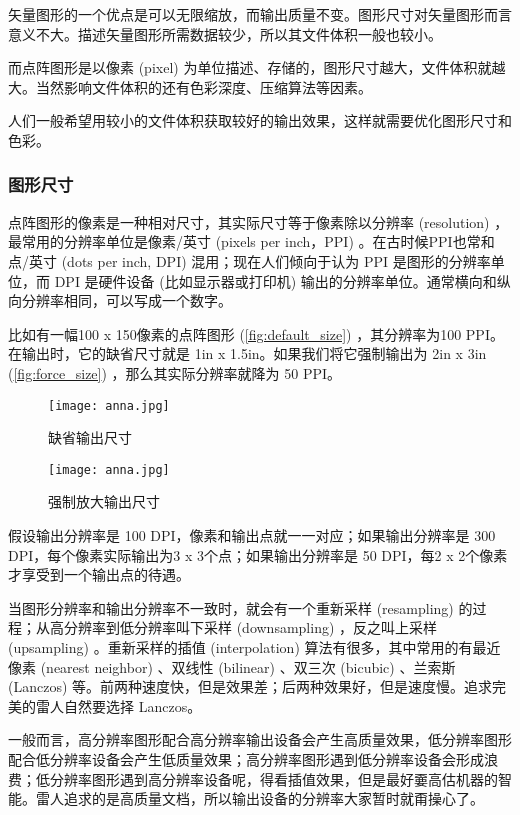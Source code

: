 矢量图形的一个优点是可以无限缩放，而输出质量不变。图形尺寸对矢量图形而言意义不大。描述矢量图形所需数据较少，所以其文件体积一般也较小。

而点阵图形是以像素 (pixel) 为单位描述、存储的，图形尺寸越大，文件体积就越大。当然影响文件体积的还有色彩深度、压缩算法等因素。

人们一般希望用较小的文件体积获取较好的输出效果，这样就需要优化图形尺寸和色彩。

\subsubsection{图形尺寸}

点阵图形的像素是一种相对尺寸，其实际尺寸等于像素除以分辨率 (resolution) ，最常用的分辨率单位是像素/英寸 (pixels per inch，PPI) 。在古时候PPI也常和点/英寸 (dots per inch, DPI) 混用；现在人们倾向于认为 PPI 是图形的分辨率单位，而 DPI 是硬件设备 (比如显示器或打印机) 输出的分辨率单位。通常横向和纵向分辨率相同，可以写成一个数字。

比如有一幅100 x 150像素的点阵图形 (\autoref{fig:default_size}) ，其分辨率为100 PPI。在输出时，它的缺省尺寸就是 1in x 1.5in。如果我们将它强制输出为 2in x 3in (\autoref{fig:force_size}) ，那么其实际分辨率就降为 50 PPI。

\begin{figure}[htbp]
\centering
\begin{minipage}[b]{1.4in}
\centering
\texttt{[image: anna.jpg]}
\caption{缺省输出尺寸}
\label{fig:default_size}
\end{minipage}
\hspace{10pt}
\begin{minipage}[b]{2in}
\centering
\texttt{[image: anna.jpg]}
\caption{强制放大输出尺寸}
\label{fig:force_size}
\end{minipage}
\end{figure}

假设输出分辨率是 100 DPI，像素和输出点就一一对应；如果输出分辨率是 300 DPI，每个像素实际输出为3 x 3个点；如果输出分辨率是 50 DPI，每2 x 2个像素才享受到一个输出点的待遇。

当图形分辨率和输出分辨率不一致时，就会有一个重新采样 (resampling) 的过程；从高分辨率到低分辨率叫下采样 (downsampling) ，反之叫上采样 (upsampling) 。重新采样的插值 (interpolation) 算法有很多，其中常用的有最近像素 (nearest neighbor) 、双线性 (bilinear) 、双三次 (bicubic) 、兰索斯 (Lanczos) 等。前两种速度快，但是效果差；后两种效果好，但是速度慢。追求完美的雷人自然要选择 Lanczos。

一般而言，高分辨率图形配合高分辨率输出设备会产生高质量效果，低分辨率图形配合低分辨率设备会产生低质量效果；高分辨率图形遇到低分辨率设备会形成浪费；低分辨率图形遇到高分辨率设备呢，得看插值效果，但是最好嫑高估机器的智能。雷人追求的是高质量文档，所以输出设备的分辨率大家暂时就甭操心了。

